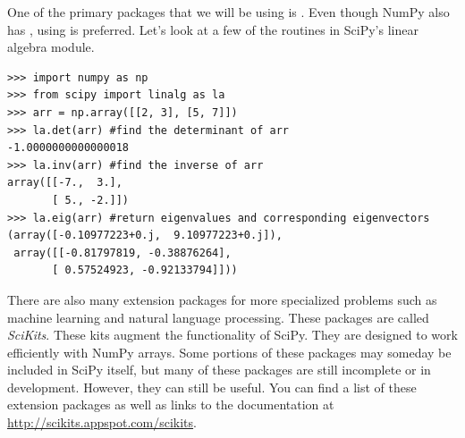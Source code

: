 One of the primary packages that we will be using is .
Even though NumPy also has , using  is preferred.
Let's look at a few of the routines in SciPy's linear algebra module.
\begin{lstlisting}
>>> import numpy as np
>>> from scipy import linalg as la
>>> arr = np.array([[2, 3], [5, 7]])
>>> la.det(arr) #find the determinant of arr
-1.0000000000000018
>>> la.inv(arr) #find the inverse of arr
array([[-7.,  3.],
       [ 5., -2.]])
>>> la.eig(arr) #return eigenvalues and corresponding eigenvectors
(array([-0.10977223+0.j,  9.10977223+0.j]),
 array([[-0.81797819, -0.38876264],
       [ 0.57524923, -0.92133794]]))
\end{lstlisting}

There are also many extension packages for more specialized problems such as machine learning and natural language processing.
These packages are called \emph{SciKits}.
These kits augment the functionality of SciPy.
They are designed to work efficiently with NumPy arrays.
Some portions of these packages may someday be included in SciPy itself, but many of these packages are still incomplete or in development.
However, they can still be useful. You can find a list of these extension packages as well 
as links to the documentation at \url{http://scikits.appspot.com/scikits}.

